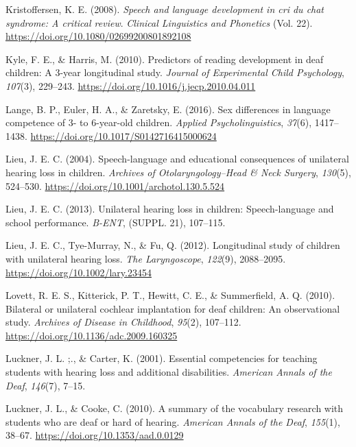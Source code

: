 \documentclass[english,man]{apa6}
\begin{document}
\leavevmode\hypertarget{ref-kristoffersen2008}{}%
Kristoffersen, K. E. (2008). \emph{Speech and language development in cri du chat syndrome: A critical review}. \emph{Clinical Linguistics and Phonetics} (Vol. 22). \url{https://doi.org/10.1080/02699200801892108}

\leavevmode\hypertarget{ref-kyle2010}{}%
Kyle, F. E., \& Harris, M. (2010). Predictors of reading development in deaf children: A 3-year longitudinal study. \emph{Journal of Experimental Child Psychology}, \emph{107}(3), 229--243. \url{https://doi.org/10.1016/j.jecp.2010.04.011}

\leavevmode\hypertarget{ref-lange2016}{}%
Lange, B. P., Euler, H. A., \& Zaretsky, E. (2016). Sex differences in language competence of 3- to 6-year-old children. \emph{Applied Psycholinguistics}, \emph{37}(6), 1417--1438. \url{https://doi.org/10.1017/S0142716415000624}

\leavevmode\hypertarget{ref-lieu2004}{}%
Lieu, J. E. C. (2004). Speech-language and educational consequences of unilateral hearing loss in children. \emph{Archives of Otolaryngology--Head \& Neck Surgery}, \emph{130}(5), 524--530. \url{https://doi.org/10.1001/archotol.130.5.524}

\leavevmode\hypertarget{ref-lieu2013}{}%
Lieu, J. E. C. (2013). Unilateral hearing loss in children: Speech-language and school performance. \emph{B-ENT}, (SUPPL. 21), 107--115.

\leavevmode\hypertarget{ref-lieu2012}{}%
Lieu, J. E. C., Tye-Murray, N., \& Fu, Q. (2012). Longitudinal study of children with unilateral hearing loss. \emph{The Laryngoscope}, \emph{122}(9), 2088--2095. \url{https://doi.org/10.1002/lary.23454}

\leavevmode\hypertarget{ref-lovett2010}{}%
Lovett, R. E. S., Kitterick, P. T., Hewitt, C. E., \& Summerfield, A. Q. (2010). Bilateral or unilateral cochlear implantation for deaf children: An observational study. \emph{Archives of Disease in Childhood}, \emph{95}(2), 107--112. \url{https://doi.org/10.1136/adc.2009.160325}

\leavevmode\hypertarget{ref-luckner2001}{}%
Luckner, J. L. ;., \& Carter, K. (2001). Essential competencies for teaching students with hearing loss and additional disabilities. \emph{American Annals of the Deaf}, \emph{146}(7), 7--15.

\leavevmode\hypertarget{ref-luckner2010}{}%
Luckner, J. L., \& Cooke, C. (2010). A summary of the vocabulary research with students who are deaf or hard of hearing. \emph{American Annals of the Deaf}, \emph{155}(1), 38--67. \url{https://doi.org/10.1353/aad.0.0129}
\end{document}
